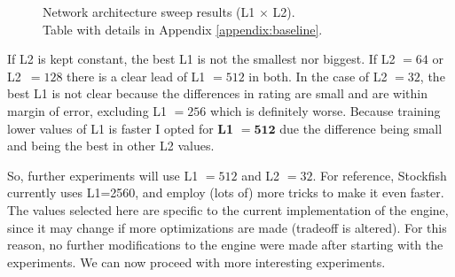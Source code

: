 \begin{figure}[H]
\centering
{}
\captionsetup{justification=centering}
\caption{Network architecture sweep results (L1 $\times$ L2).\\ Table with details in Appendix \ref{appendix:baseline}.}
\label{fig:baseline_heatmaps}
\end{figure}

If L2 is kept constant, the best L1 is not the smallest nor biggest. If L2 $=64$ or \mbox{L2 $=128$} there is a clear lead of L1 $=512$ in both. In the case of L2 $=32$, the best L1 is not clear because the differences in rating are small and are within margin of error, excluding L1 $=256$ which is definitely worse. Because training lower values of L1 is faster I opted for \textbf{L1} $\bm{=512}$ due the difference being small and being the best in other L2 values.

So, further experiments will use L1 $=512$ and L2 $=32$. For reference, Stockfish currently uses L1=2560, and employ (lots of) more tricks to make it even faster. The values selected here are specific to the current implementation of the engine, since it may change if more optimizations are made (tradeoff is altered). For this reason, no further modifications to the engine were made after starting with the experiments. We can now proceed with more interesting experiments.
